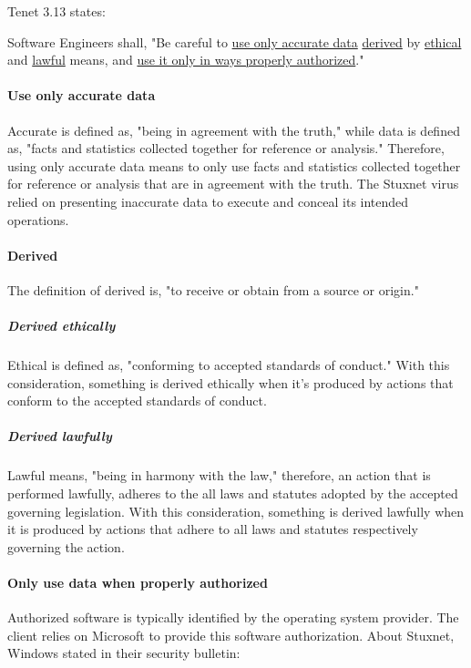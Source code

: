 \documentclass[12pt]{article}
\begin{document}
\begin{multicols}{2}
Tenet 3.13  states:
\begin{framed}
Software Engineers shall, "Be careful to \ul{use only accurate data} \ul{derived} by \ul{ethical} and \ul{lawful} means, and \ul{use it only in ways properly authorized}."\cite{softwareEngineeringCodeOfEthics}
\end{framed}

\paragraph{Use only accurate data}
Accurate is defined as, "being in agreement with the truth," while data is defined as, "facts and statistics collected together for reference or analysis."\cite{cambridgeDictionary} Therefore, using only accurate data means to only use facts and statistics collected together for reference or analysis that are in agreement with the truth. The Stuxnet virus relied on presenting inaccurate data to execute and conceal its intended operations.

\paragraph{Derived}
The definition of derived is, "to receive or obtain from a source or origin."\cite{softwareDefinition}

\subparagraph{Derived ethically}
Ethical is defined as, "conforming to accepted standards of conduct."\cite{cambridgeDictionary} With this consideration, something is derived ethically when it's produced by actions that conform to the accepted standards of conduct.

\subparagraph{Derived lawfully}
Lawful means, "being in harmony with the law," therefore, an action that is performed lawfully, adheres to the all laws and statutes adopted by the accepted governing legislation.\cite{cambridgeDictionary} With this consideration, something is derived lawfully when it is produced by actions that adhere to all laws and statutes respectively governing the action.

\paragraph{Only use data when properly authorized}

Authorized software is typically identified by the operating system provider.  The client relies on Microsoft to provide this software authorization.  About Stuxnet, Windows stated in their security bulletin:


\end{multicols}
\end{document}
